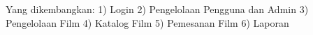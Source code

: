    Yang dikembangkan:
   1) Login
   2) Pengelolaan Pengguna dan Admin
   3) Pengelolaan Film
   4) Katalog Film
   5) Pemesanan Film
   6) Laporan

